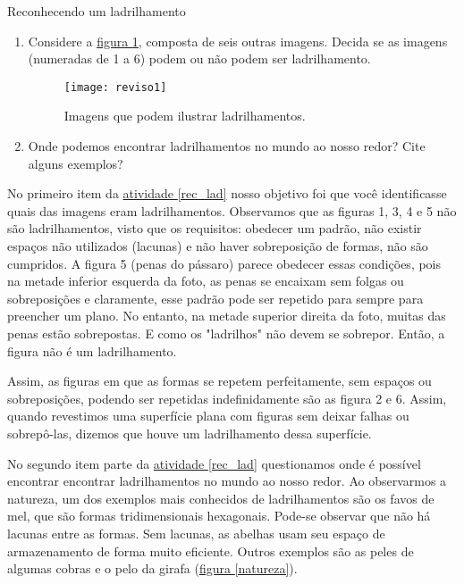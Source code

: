 \begin{task}{Reconhecendo um ladrilhamento} \label{rec_lad}
\begin{enumerate}
\item Considere  a \hyperref[ladr12]{figura \ref{ladr12}}, composta de seis outras imagens. Decida se as imagens (numeradas de 1 a 6) podem ou não podem ser  ladrilhamento.

\begin{figure}[H]
\centering
\texttt{[image: reviso1]}
\caption{Imagens que podem ilustrar ladrilhamentos.}
\label{ladr12}
\end{figure}

\item Onde podemos encontrar ladrilhamentos no mundo ao nosso redor? Cite alguns exemplos?

\end{enumerate}

\end{task}




No primeiro item da \hyperref[rec_lad]{atividade \ref{rec_lad}} nosso objetivo foi que você identificasse quais das imagens eram ladrilhamentos.
Observamos que as figuras 1, 3, 4 e 5 não são ladrilhamentos, visto que os requisitos:  obedecer um padrão, não existir espaços não utilizados (lacunas) e não haver sobreposição de formas, não são cumpridos. A figura 5 (penas do pássaro) parece obedecer essas condições, pois na metade inferior esquerda da foto, as penas se encaixam sem folgas ou sobreposições e claramente, esse padrão pode ser repetido para sempre para preencher um plano. No entanto, na metade superior direita da foto, muitas das penas estão sobrepostas. E como os "ladrilhos" não devem se sobrepor. Então, a figura não é um ladrilhamento.

Assim, as figuras em que as formas se repetem perfeitamente, sem espaços ou sobreposições, podendo ser repetidas indefinidamente são as figura 2 e 6.
Assim,  quando revestimos uma superfície plana com figuras sem deixar falhas ou sobrepô-las, dizemos que houve um ladrilhamento dessa superfície. 

No segundo item parte da  \hyperref[rec_lad]{atividade \ref{rec_lad}} questionamos onde é possível encontrar encontrar ladrilhamentos no mundo ao nosso redor. 
Ao observarmos a natureza, um dos exemplos mais conhecidos de ladrilhamentos são os favos de mel, que são formas tridimensionais hexagonais. Pode-se observar que não há lacunas entre as formas. Sem lacunas, as abelhas usam seu espaço de armazenamento de forma muito eficiente. Outros exemplos são as peles de algumas cobras e o pelo da girafa (\hyperref[natureza]{figura \ref{natureza}}).


